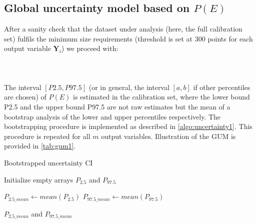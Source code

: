 \subsection{Global uncertainty model based on $P(E)$}\label{subsec:GUM}
After a sanity check that the dataset under analysis (here, the full calibration set) fulfils the minimum size requirements (threshold is set at 300 points for each output variable $\mathbf{Y}_i$) we proceed with:\\
%
\paragraph{ \\}
The interval $[P2.5, P97.5]$ (or in general, the interval $[a,b]$ if other percentiles are chosen) of $P(E)$ is estimated in the calibration set, where the lower bound P2.5 and the upper bound P97.5 are not raw estimates but the mean of a bootstrap analysis of the lower and upper percentiles respectively. The bootstrapping procedure is implemented as described in \autoref{algo:uncertainty1}. This procedure is repeated for all $m$ output variables. Illustration of the GUM is provided in \autoref{tab:gum1}.
\begin{algorithm}
	\caption{Bootstrapped uncertainty CI}
	\label{algo:uncertainty1}
	
	Initialize empty arrays $P_{2.5}$ and $P_{97.5}$\;
	
	
	$P_{2.5\_mean}\leftarrow mean(P_{2.5})$\;
	$P_{97.5\_mean}\leftarrow mean(P_{97.5})$\;
	
	\Return $P_{2.5\_mean}$ and $P_{97.5\_mean}$\;
\end{algorithm}
%
